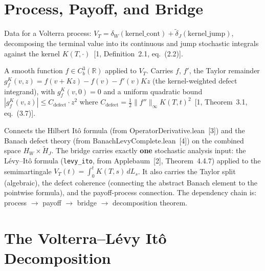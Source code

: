 \section{Process, Payoff, and Bridge}

\begin{defn}\label{def:VolterraProcessData}
\leanok
{}
Data for a Volterra process: $V_T = \delta_W(\text{kernel\_cont}) + \tilde{\delta}_J(\text{kernel\_jump})$, decomposing the terminal value into its continuous and jump stochastic integrals against the kernel $K(T,\cdot)$~[1, Definition~2.1, eq.~(2.2)].
\end{defn}

\begin{defn}\label{def:SmoothPayoff}
\leanok
{}
A smooth function $f \in C_b^3(\mathbb{R})$ applied to $V_T$. Carries $f$, $f'$, the Taylor remainder $g_f^K(v,z) = f(v+Kz) - f(v) - f'(v)Kz$ (the kernel-weighted defect integrand), with $g_f^K(v,0) = 0$ and a uniform quadratic bound $|g_f^K(v,z)| \leq C_{\mathrm{defect}} \cdot z^2$ where $C_{\mathrm{defect}} = \tfrac{1}{2}\|f''\|_\infty K(T,t)^2$~[1, Theorem~3.1, eq.~(3.7)].
\end{defn}

\begin{defn}\label{def:HilbertJumpBridge}
\leanok
{}
Connects the Hilbert It\^o formula (from OperatorDerivative.lean~[3]) and the Banach defect theory (from BanachLevyComplete.lean~[4]) on the combined space $H_W \times \tilde{H}_J$. The bridge carries exactly \textbf{one} stochastic analysis input: the L\'evy--It\^o formula (\texttt{levy\_ito}, from Applebaum~[2], Theorem~4.4.7) applied to the semimartingale $V_T(t) = \int_0^t K(T,s)\,dL_s$. It also carries the Taylor split (algebraic), the defect coherence (connecting the abstract Banach element to the pointwise formula), and the payoff-process connection. The dependency chain is: process $\to$ payoff $\to$ bridge $\to$ decomposition theorem.
\end{defn}

\section{The Volterra--L\'evy It\^o Decomposition}

